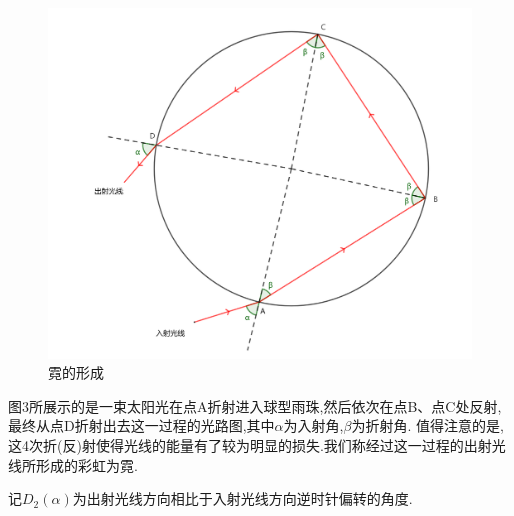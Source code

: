 \documentclass[a4paper]{article}%
\begin{document}
\begin{figure}[H]
   \centering
   \includegraphics[scale=0.75]{图3}
   \caption[图3]{霓的形成}\label{fig-图3}
   \end{figure}


图3所展示的是一束太阳光在点A折射进入球型雨珠,然后依次在点B、点C处反射,最终从点D折射出去这一过程的光路图,其中$\alpha$为入射角,$\beta$为折射角.
值得注意的是,这4次折(反)射使得光线的能量有了较为明显的损失.我们称经过这一过程的出射光线所形成的彩虹为霓.



记$D_2(\alpha)$为出射光线方向相比于入射光线方向逆时针偏转的角度.
\end{document}
